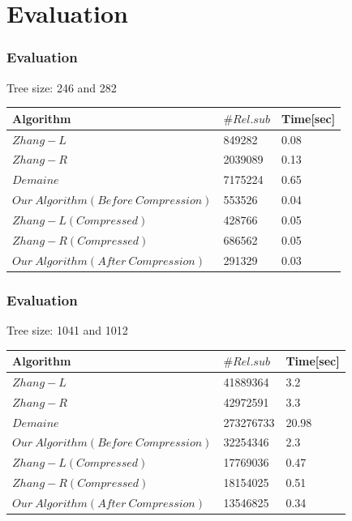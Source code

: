 \documentclass{beamer}
\begin{document}
\section{Evaluation}
\begin{frame}
\frametitle{Evaluation}
Tree size: 246 and 282
\begin{table}
			\centering
			\begin{tabular}{l l l}
				\toprule
				\textbf{Algorithm} & \textbf{$\#Rel.sub$} &\textbf{Time[sec]}\\
				\midrule
				$Zhang-L$ & 849282 & 0.08\\
				$Zhang-R$ & 2039089 & 0.13\\
				$Demaine$ & 7175224 & 0.65\\
				$Our\ Algorithm(Before\ Compression)$ & 553526 & 0.04\\
				$Zhang-L(Compressed)$ & 428766 & 0.05\\
				$Zhang-R(Compressed)$ & 686562 & 0.05\\
				$Our\ Algorithm(After\ Compression)$ & 291329 & 0.03\\
			\end{tabular}
\end{table}
\end{frame}
\begin{frame}
\frametitle{Evaluation}
Tree size: 1041 and 1012
\begin{table}
			\centering
			\begin{tabular}{l l l}
				\toprule
				\textbf{Algorithm} & \textbf{$\#Rel.sub$} &\textbf{Time[sec]}\\
				\midrule
				$Zhang-L$ & 41889364 & 3.2\\
				$Zhang-R$ & 42972591 & 3.3\\
				$Demaine$ & 273276733 & 20.98\\
				$Our\ Algorithm(Before\ Compression)$ & 32254346 & 2.3\\
				$Zhang-L(Compressed)$ & 17769036 & 0.47\\
				$Zhang-R(Compressed)$ & 18154025 & 0.51\\
				$Our\ Algorithm(After\ Compression)$ & 13546825 & 0.34\\
			\end{tabular}
\end{table}
\end{frame}
\end{document}
